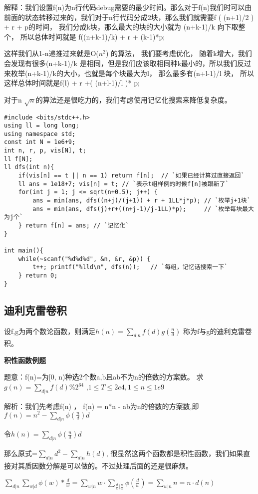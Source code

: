 解释：我们设置f(n)为n行代码debug需要的最少时间。那么对于f(n)我们时可以由前面的状态转移过来的，我们对于n行代码分成2块，那么我们就需要f ( (n+1)/2  ) + r  + p的时间， 我们分成k块，那么最大的块的大小就为 (n+k-1)/k 向下取整个， 所以总体时间就是 f((n+k-1)/k) + r + (k-1)*p;

这样我们从1-n递推过来就是O($n^2$) 的算法， 我们要考虑优化， 随着k增大，我们会发现有很多(n+k-1)/k 是相同，但是我们应该取相同种k最小的，所以我们反过来枚举(n+k-1)/k的大小，也就是每个块最大为l， 那么最多有(n+l-1)/l 块， 所以这样总体时间就是f(l) + r +( (n+l-1)/l )* p;

对于n $\sqrt n$的算法还是很吃力的，我们考虑使用记忆化搜索来降低复杂度。

\begin{lstlisting}
#include <bits/stdc++.h>
using ll = long long;
using namespace std;
const int N = 1e6+9;
int n, r, p, vis[N], t;
ll f[N];
ll dfs(int n){
    if(vis[n] == t || n == 1) return f[n];  // `如果已经计算过直接返回`
    ll ans = 1e18+7; vis[n] = t; // `表示t组样例的时候f[n]被跟新了`
    for(int j = 1; j <= sqrt(n+0.5); j++) {
        ans = min(ans, dfs((n+j)/(j+1)) + r + 1LL*j*p); // `枚举j+1块`
        ans = min(ans, dfs(j)+r+((n+j-1)/j-1LL)*p);     // `枚举每块最大为j个`
    } return f[n] = ans; // `记忆化`
}

int main(){
    while(~scanf("%d%d%d", &n, &r, &p)) {
        t++; printf("%lld\n", dfs(n));   // `每组，记忆话搜索一下`
    } return 0;
}
\end{lstlisting}

\subsection{迪利克雷卷积}

设f,g为两个数论函数，则满足$h(n) = \sum_{d|n} f(d)g(\frac{n}{d})$ 称为f与g的迪利克雷卷积。

{\bfseries 积性函数例题}

题意：f(n)=为[0, n)种选2个数a,b且ab不为n的倍数的方案数。 求$g(n) = \sum_{d|n} f(d) \% 2^{64}$
,$1 \le T \le 2e4, 1 \le n \le 1e9$

解析：我们先考虑f(n) ， f(n) = n*n - ab为n的倍数的方案数,即$f(n) = n^2 -  \sum_{d|n}\phi(\frac{n}{d})d$

 令$h(n) = \sum_{d|n}\phi(\frac{n}{d})d$

 那么原式=$\sum_{d|n}d^2 - \sum_{d|n}h(d)$, 很显然这两个函数都是积性函数，我们如果直接对其质因数分解是可以做的。不过处理后面的还是很麻烦。

 $\sum_{d|n}\sum_{w|d}\phi(w) * \frac{d}{w} = \sum_{w|n}w· \sum_{\frac{d}{w} |\frac{n}{w} } \phi(\frac{d}{w}) = \sum_{w|n} n = n·d(n)$

